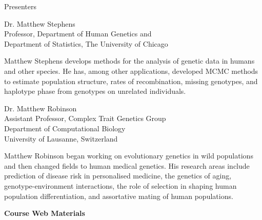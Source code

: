 
\vspace*{1in}
\begin{center}\color{section0}\bf\Large
\coursetitlepage
\end{center}
\es\bs

\begin{center}\color{section0} Presenters\end{center}
\enlargethispage*{1000pt}

% 

{\small
{\color{section0}Dr. Matthew Stephens\\
Professor, Department of Human Genetics and\\
Department of Statistics, The University of Chicago}	

Matthew Stephens develops methods for the analysis of genetic data in humans and other species. He has, among other applications, developed MCMC methods to estimate population structure, rates of recombination, missing genotypes, and haplotype phase from genotypes on unrelated individuals.

{\color{section0}Dr. Matthew Robinson \\
Assistant Professor, Complex Trait Genetics Group\\
Department of Computational Biology \\
University of Lausanne, Switzerland}
  
Matthew Robinson began working on evolutionary genetics in wild populations and then changed fields to human 
medical genetics.  His research areas include 
prediction of disease risk in personalised medicine, the genetics of aging,
genotype-environment interactions, the role of selection in shaping human
population differentiation, and assortative mating of human populations.

}

\es\bs
\begin{center}
{\color{section0}\bf\Large Course Web Materials}
\end{center}
\vspace*{.25in}
\enlargethispage*{1000pt}

